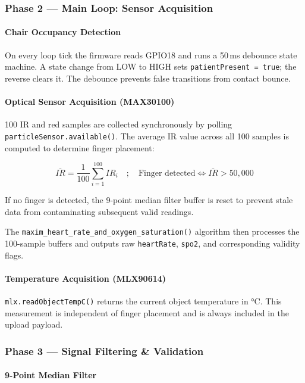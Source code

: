 \documentclass[12pt,a4paper]{report}
\begin{document}
\subsubsection{Phase 2 — Main Loop: Sensor Acquisition}

\paragraph{Chair Occupancy Detection}

On every loop tick the firmware reads GPIO18 and runs a 50\,ms debounce state machine.
A state change from LOW to HIGH sets \texttt{patientPresent = true}; the reverse clears
it. The debounce prevents false transitions from contact bounce.

\paragraph{Optical Sensor Acquisition (MAX30100)}

100 IR and red samples are collected synchronously by polling \texttt{particleSensor.available()}.
The average IR value across all 100 samples is computed to determine finger placement:

$$\overline{IR} = \frac{1}{100}\sum_{i=1}^{100} IR_i \quad ; \quad \text{Finger detected} \Leftrightarrow \overline{IR} > 50{,}000$$

If no finger is detected, the 9-point median filter buffer is reset to prevent stale data
from contaminating subsequent valid readings.

The \texttt{maxim\_heart\_rate\_and\_oxygen\_saturation()} algorithm then processes the
100-sample buffers and outputs raw \texttt{heartRate}, \texttt{spo2}, and corresponding
validity flags.

\paragraph{Temperature Acquisition (MLX90614)}

\texttt{mlx.readObjectTempC()} returns the current object temperature in °C. This
measurement is independent of finger placement and is always included in the upload payload.

\subsubsection{Phase 3 — Signal Filtering \& Validation}

\paragraph{9-Point Median Filter}
\end{document}
